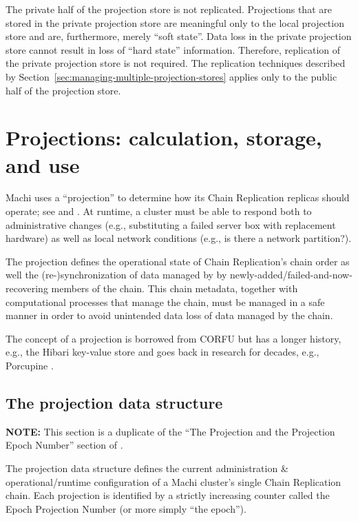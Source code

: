 \documentclass[preprint,10pt]{sigplanconf}
\begin{document}
The private half of the projection store is not replicated.
Projections that are stored in the private projection store are
meaningful only to the local projection store and are, furthermore,
merely ``soft state''.  Data loss in the private projection store
cannot result in loss of ``hard state'' information.  Therefore,
replication of the private projection store is not required.  The
replication techniques described by
Section~\ref{sec:managing-multiple-projection-stores} applies only to
the public half of the projection store.

\section{Projections: calculation, storage, and use}
\label{sec:projections}

Machi uses a ``projection'' to determine how its Chain Replication replicas
should operate; see \cite{machi-design} and
\cite{corfu1}.  At runtime, a cluster must be able to respond both to
administrative changes (e.g., substituting a failed server box with
replacement hardware) as well as local network conditions (e.g., is
there a network partition?).

The projection defines the operational state of Chain Replication's
chain order as well the (re-)synchronization of data managed by by
newly-added/failed-and-now-recovering members of the chain.  This
chain metadata, together with computational processes that manage the
chain, must be managed in a safe manner in order to avoid unintended
data loss of data managed by the chain.

The concept of a projection is borrowed
from CORFU but has a longer history, e.g., the Hibari key-value store
\cite{cr-theory-and-practice} and goes back in research for decades,
e.g., Porcupine \cite{porcupine}.

\subsection{The projection data structure}
\label{sub:the-projection}

{\bf NOTE:} This section is a duplicate of the ``The Projection and
the Projection Epoch Number'' section of \cite{machi-design}.

The projection data
structure defines the current administration \& operational/runtime
configuration of a Machi cluster's single Chain Replication chain.
Each projection is identified by a strictly increasing counter called
the Epoch Projection Number (or more simply ``the epoch'').
\end{document}
